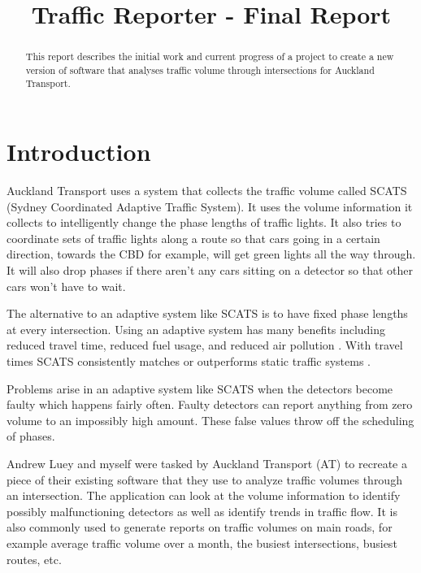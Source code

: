 \documentclass{article}
\title{Traffic Reporter - Final Report}
\begin{document}


\maketitle



\begin{abstract}
This report describes the initial work and current
progress of a project to create a new version of software that
analyses traffic volume through intersections for Auckland
Transport.

\end{abstract}



\section{Introduction}

Auckland Transport uses a system that collects the traffic
volume called SCATS (Sydney Coordinated Adaptive Traffic
System)\cite{sims1981scat}. It uses the volume information it collects to
intelligently change the phase lengths of traffic lights. It also
tries to coordinate sets of traffic lights along a route so that
cars going in a certain direction, towards the CBD for
example, will get green lights all the way through. It will also
drop phases if there aren’t any cars sitting on a detector so that
other cars won’t have to wait.

The alternative to an adaptive system like SCATS is to have
fixed phase lengths at every intersection. Using an adaptive
system has many benefits including reduced travel time,
reduced fuel usage, and reduced air pollution \cite{sims1981scat}. With travel
times SCATS consistently matches or outperforms static
traffic systems \cite{hunter2012probe}.

Problems arise in an adaptive system like SCATS when the
detectors become faulty which happens fairly often. Faulty
detectors can report anything from zero volume to an
impossibly high amount. These false values throw off the
scheduling of phases.

Andrew Luey and myself were tasked by Auckland
Transport (AT) to recreate a piece of their existing software
that they use to analyze traffic volumes through an
intersection. The application can look at the volume
information to identify possibly malfunctioning detectors as
well as identify trends in traffic flow. It is also commonly used
to generate reports on traffic volumes on main roads, for
example average traffic volume over a month, the busiest
intersections, busiest routes, etc.
\end{document}
